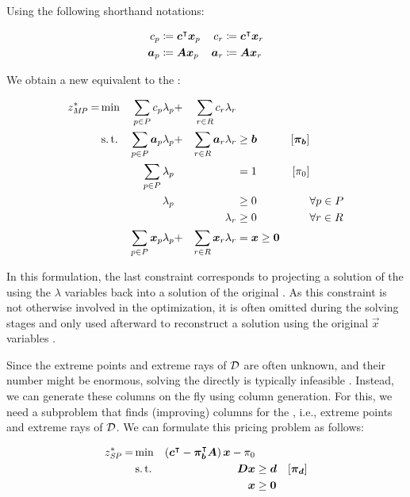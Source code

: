 Using the following shorthand notations:

\begin{equation}
\begin{aligned}
c_p &\coloneqq {\bm{c}}^\intercal {\bm{x}}_p
&c_r &\coloneqq {\bm{c}}^\intercal {\bm{x}}_r \\
{\bm{a}}_p &\coloneqq {\bm{A}} {\bm{x}}_p
&{\bm{a}}_r &\coloneqq {\bm{A}} {\bm{x}}_r
\end{aligned}
\end{equation}

We obtain a new \MP{} equivalent to the \LP{}:

\begin{equation}
\begin{aligned}
z^*_{\textit{MP}}{} = &\min & \sum_{p \in P} c_p \lambda_p &+ &\sum_{r \in R} c_r \lambda_r & & & \\
&\operatorname{s.t.} & \sum_{p \in P} {\bm{a}}_p \lambda_p &+ &\sum_{r \in R} {\bm{a}}_r \lambda_r & \geq {\bm{b}} & \left[{\bm{\pi}}_{\bm{b}}\right] \\
&& \sum_{p \in P} \lambda_p & & & = 1 & \left[\pi_0 \right] & \\
&& \lambda_p & & & \geq 0 & & \forall p \in P \\
&& & & \lambda_r & \geq 0 & & \forall r \in R \\
&& \sum_{p \in P} {\bm{x}}_p \lambda_p &+ &\sum_{r \in R} {\bm{x}}_r \lambda_r & = {\bm{x}} \geq {\bm{0}} & &
\end{aligned}
\end{equation}

In this formulation, the last constraint corresponds to projecting a solution of the \MP{} using the $\lambda$ variables back into a solution of the original \LP{}. As this constraint is not otherwise involved in the optimization, it is often omitted during the solving stages and only used afterward to reconstruct a solution using the original $\vec{x}$ variables \cite{thebook}.

Since the extreme points and extreme rays of $\mathcal{D}$ are often unknown, and their number might be enormous, solving the \MP{} directly is typically infeasible \cite{thebook}. Instead, we can generate these columns on the fly using column generation. For this, we need a subproblem that finds (improving) columns for the \MP{}, i.e., extreme points and extreme rays of $\mathcal{D}$. We can formulate this pricing problem as follows:

\begin{equation}
\begin{aligned}
z^*_\SP{} = &\min & \left( \vec{c}\transpose - \vec{\pi}_\vec{b}\transpose \mat{A} \right) \vec{x} - \pi_0 & & \\
&\st & \mat{D} \vec{x} & \geq \vec{d} & \left[\vec{\pi}_\vec{d}\right] \\
&& \vec{x} & \geq \vec{0}
\end{aligned}
\end{equation}

